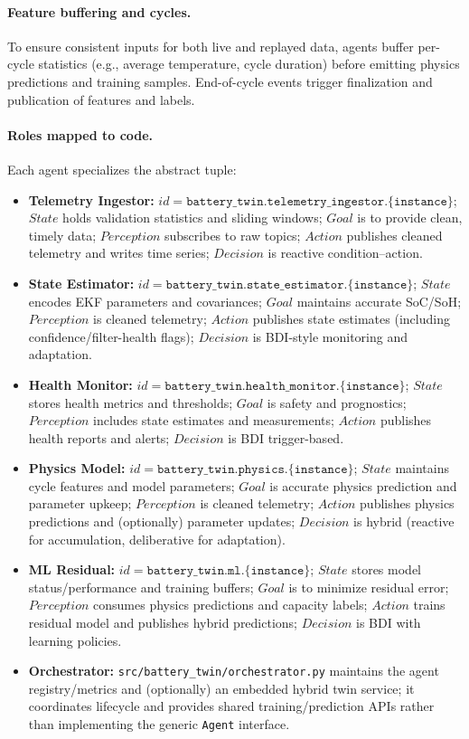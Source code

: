 \paragraph{Feature buffering and cycles.} To ensure consistent inputs for both live and replayed data, agents buffer per-cycle statistics (e.g., average temperature, cycle duration) before emitting physics predictions and training samples. End-of-cycle events trigger finalization and publication of features and labels.

\paragraph{Roles mapped to code.} Each agent specializes the abstract tuple:
\begin{itemize}
  \item \textbf{Telemetry Ingestor:} $id=\texttt{battery\_twin.telemetry\_ingestor.\{instance\}}$; $State$ holds validation statistics and sliding windows; $Goal$ is to provide clean, timely data; $Perception$ subscribes to raw topics; $Action$ publishes cleaned telemetry and writes time series; $Decision$ is reactive condition--action.
  \item \textbf{State Estimator:} $id=\texttt{battery\_twin.state\_estimator.\{instance\}}$; $State$ encodes EKF parameters and covariances; $Goal$ maintains accurate SoC/SoH; $Perception$ is cleaned telemetry; $Action$ publishes state estimates (including confidence/filter-health flags); $Decision$ is BDI-style monitoring and adaptation.
  \item \textbf{Health Monitor:} $id=\texttt{battery\_twin.health\_monitor.\{instance\}}$; $State$ stores health metrics and thresholds; $Goal$ is safety and prognostics; $Perception$ includes state estimates and measurements; $Action$ publishes health reports and alerts; $Decision$ is BDI trigger-based.
  \item \textbf{Physics Model:} $id=\texttt{battery\_twin.physics.\{instance\}}$; $State$ maintains cycle features and model parameters; $Goal$ is accurate physics prediction and parameter upkeep; $Perception$ is cleaned telemetry; $Action$ publishes physics predictions and (optionally) parameter updates; $Decision$ is hybrid (reactive for accumulation, deliberative for adaptation).
  \item \textbf{ML Residual:} $id=\texttt{battery\_twin.ml.\{instance\}}$; $State$ stores model status/performance and training buffers; $Goal$ is to minimize residual error; $Perception$ consumes physics predictions and capacity labels; $Action$ trains residual model and publishes hybrid predictions; $Decision$ is BDI with learning policies.
  \item \textbf{Orchestrator:} \texttt{src/battery\_twin/orchestrator.py} maintains the agent registry/metrics and (optionally) an embedded hybrid twin service; it coordinates lifecycle and provides shared training/prediction APIs rather than implementing the generic \texttt{Agent} interface.
\end{itemize}

